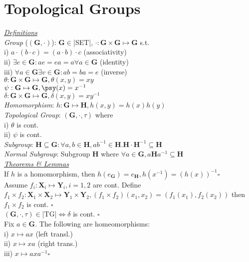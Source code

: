 \section{Topological Groups}
\underline{\emph{Definitions}}\\
\emph{Group} ($(\mathbf{G},\cdot)$): $\mathbf{G}\in$|SET|, $\cdot:\mathbf{G}\times\mathbf{G}\mapsto\mathbf{G}$ s.t.\\
i) $a\cdot(b\cdot c)=(a\cdot b)\cdot c$ (associativity)\\
ii) $\exists e\in\mathbf{G}:ae=ea=a\forall a\in\mathbf{G}$ (identity)\\
iii) $\forall a\in\mathbf{G}\exists v\in\mathbf{G}:ab=ba=e$ (inverse)\\
$\theta:\mathbf{G}\times\mathbf{G}\mapsto\mathbf{G},\theta(x,y)=xy$\\
$\psi:\mathbf{G}\mapsto\mathbf{G},\psy(x)=x^{-1}$\\
$\delta:\mathbf{G}\times\mathbf{G}\mapsto\mathbf{G},\delta(x,y)=xy^{-1}$\\
\emph{Homomorphism}: $h:\mathbf{G}\mapsto\mathbf{H},h(x,y)=h(x)h(y)$\\
\emph{Topological Group}: $(\mathbf{G},\cdot,\tau)$ where\\
i) $\theta$ is cont.\\
ii) $\psi$ is cont.\\
\emph{Subgroup}: $\mathbf{H}\subseteq\mathbf{G}:\forall a,b\in\mathbf{H},ab^{-1}\in\mathbf{H}. \mathbf{H}\cdot\mathbf{H}^{-1}\subseteq\mathbf{H}$\\
\emph{Normal Subgroup}: Subgroup $\mathbf{H}$ where $\forall a\in\mathbf{G},a\mathbf{H}a^{-1}\subseteq\mathbf{H}$
\\\underline{\emph{Theorems \& Lemmas}}\\
If $h$ is a homomorphism, then $h(e_\mathbf{G})=e_\mathbf{H},h(x^{-1})=(h(x))^{-1} \square$\\
Assume $f_i:\mathbf{X}_i\mapsto\mathbf{Y}_i,i=1,2$ are cont.
Define $f_1\times f_2:\mathbf{X}_1\times\mathbf{X}_2\mapsto\mathbf{Y}_1\times\mathbf{Y}_2,(f_1\times f_2)(x_1,x_2)=(f_1(x_1),f_2(x_2))$ then $f_1\times f_2$ is cont. $\square$\\
$(\mathbf{G},\cdot,\tau)\in$|TG|$\iff\delta$ is cont. $\square$\\
Fix $a\in\mathbf{G}$. The following are homeomorphisms:\\
i) $x\mapsto ax$ (left transl.)\\
ii) $x\mapsto xa$ (right trans.)\\
iii) $x\mapsto axa^{-1} \square$\\
